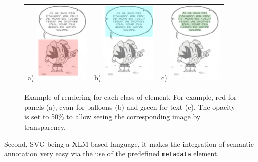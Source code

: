 
\begin{figure}[h!]
\begin{center}
\begin{tabular}{ccc}
a) \includegraphics[width=100px]{svgPanel.png} 
& 
b) \includegraphics[width=100px]{svgBalloon.png}
&
c) \includegraphics[width=100px]{svgTextlines.png}
\end{tabular}
\caption[Annotation rendering in a browser]{Example of rendering for each class of element. For example, red for panels (a), cyan for balloons (b) and green for text (c). The opacity is set to 50\% to allow seeing the corresponding image by transparency.} 
\label{fig:gt:svgImage}
\end{center}
\end{figure}


Second, SVG being a XLM-based language, it makes the integration of semantic annotation very easy via the use of the predefined \texttt{metadata} element.

